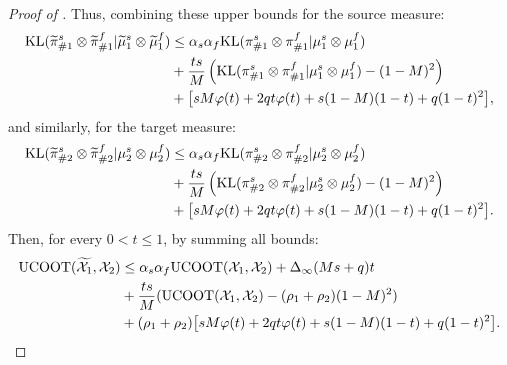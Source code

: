 \begin{proof}[Proof of ]
  Thus, combining these upper bounds for the source measure:
  \begin{equation}
    \begin{split}
      \text{KL}(\widetilde{\pi}^s_{\#1} \otimes \widetilde{\pi}^f_{\#1} \vert \widetilde{\mu}^s_1 \otimes \widetilde{\mu}^f_1)
      &\leq \alpha_s\alpha_f \text{KL}(\pi^s_{\#1} \otimes \pi^f_{\#1} \vert \mu^s_1 \otimes \mu^f_1) \\
      &+ \frac{ts}{M}\left(\text{KL}(\pi^s_{\#1} \otimes \pi^f_{\#1} \vert \mu^s_1 \otimes \mu^f_1) - (1-M)^2\right) \\
      &+ \big[  sM \varphi(t)+ 2q t \varphi(t) + s(1-M)(1-t) + q(1-t)^2 \big],
    \end{split}
  \end{equation}
  and similarly, for the target measure:
  \begin{equation}
    \begin{split}
      \text{KL}(\widetilde{\pi}^s_{\#2} \otimes \widetilde{\pi}^f_{\#2} \vert \mu^s_2 \otimes \mu^f_2)
      &\leq \alpha_s\alpha_f \text{KL}(\pi^s_{\#2} \otimes \pi^f_{\#2} \vert \mu^s_2 \otimes \mu^f_2) \\
      &+ \frac{ts}{M}\left(\text{KL}(\pi^s_{\#2} \otimes \pi^f_{\#2} \vert \mu^s_2 \otimes \mu^f_2)
      - (1-M)^2\right) \\
      &+ \big[ sM \varphi(t)+ 2q t \varphi(t) + s(1-M)(1-t) + q(1-t)^2 \big].
    \end{split}
  \end{equation}
  Then, for every $0 < t \leq 1$, by summing all bounds:
  \begin{equation}
    \begin{split}
      \text{UCOOT}(\widetilde{\mathcal X_1}, \mathcal X_2) &\leq \alpha_s\alpha_f \text{UCOOT}(\mathcal X_1, \mathcal X_2) +
      \Delta_{\infty}(Ms + q)t \\
      &+ \frac{ts}{M}(\text{UCOOT}(\mathcal X_1, \mathcal X_2) - (\rho_1 + \rho_2)(1-M)^2) \\
      &+ (\rho_1 + \rho_2) \big[ s M \varphi(t) + 2q t \varphi(t)
      + s(1-M)(1-t) + q(1-t)^2 \big].
    \end{split}
  \end{equation}

\end{proof}
